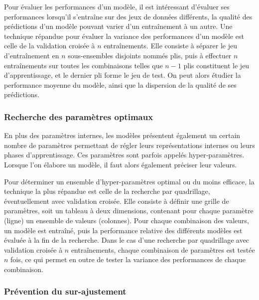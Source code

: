 \label{apprentissage_automatique_validation_croisée}

\par Pour évaluer les performances d'un modèle, il est intéressant d'évaluer ses performances lorsqu'il s'entraîne sur des jeux de données différents, la qualité des prédictions d'un modèle pouvant varier d'un entraînement à un autre. Une technique répandue pour évaluer la variance des performances d'un modèle est celle de la validation croisée à $n$ entraînements. Elle consiste à séparer le jeu d'entraînement en $n$ sous-ensembles disjoints nommés plis, puis à effectuer $n$ entraînements sur toutes les combinaisons telles que $n-1$ plis constituent le jeu d'apprentissage, et le dernier pli forme le jeu de test. On peut alors étudier la performance moyenne du modèle, ainsi que la dispersion de la qualité de ses prédictions.


\subsubsection{Recherche des paramètres optimaux}

\label{apprentissage_automatique_quadri}
\par En plus des paramètres internes, les modèles présentent également un certain nombre de paramètres permettant de régler leurs représentations internes ou leurs phases d'apprentissage. Ces paramètres sont parfois appelés hyper-paramètres. Lorsque l'on élabore un modèle, il faut alors également préciser leur valeurs.\\
\par Pour déterminer un ensemble d'hyper-paramètres optimal ou du moins efficace, la technique la plus répandue est celle de la recherche par quadrillage, éventuellement avec validation croisée. Elle consiste à définir une grille de paramètres, soit un tableau à deux dimensions, contenant pour chaque paramètre (ligne) un ensemble de valeurs (colonnes). Pour chaque combinaison des valeurs, un modèle est entraîné, puis la performance relative des différents modèles est évaluée à la fin de la recherche. Dans le cas d'une recherche par quadrillage avec validation croisée à $n$ entraînements, chaque combinaison de paramètres est testée $n$ fois, ce qui permet en outre de tester la variance des performances de chaque combinaison.

\subsubsection{Prévention du sur-ajustement}
\label{sur_ajustement}

